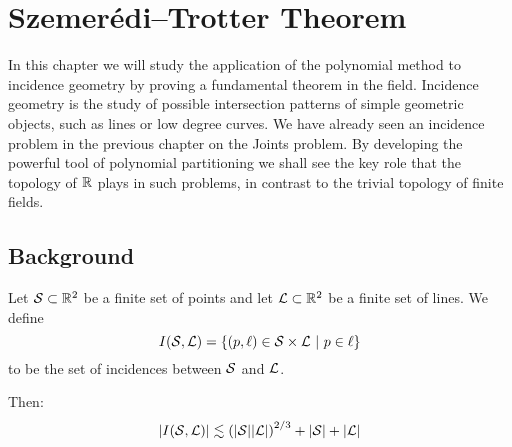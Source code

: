 \chapter{Szemerédi–Trotter Theorem}

In this chapter we will study the application of the polynomial method to incidence geometry by proving a fundamental theorem in the field.
Incidence geometry is the study of possible intersection patterns of simple geometric objects, such as lines or low degree curves. 
We have already seen an incidence problem in the previous chapter on the Joints problem. 
By developing the powerful tool of polynomial partitioning we shall see the key role that the topology of $\mathbb R$ plays in such problems, in contrast to the trivial topology of finite fields. 


\section{Background}



\begin{theorem}
    Let $\mathcal S \subset\mathbb R^2$ be a finite set of points and
    let $\mathcal L \subset \mathbb R^2$ be a finite set of lines. We define 
    \[I(\ES,\LL) = \{(p, \ell) \in \ES \times \LL \ | \ p \in \ell\}\] 
    to be the set of incidences between $\mathcal S$ and $\mathcal L$. 
   
    Then:
    \[
        |I(\mathcal S, \mathcal L)| \lesssim \left(|\mathcal S||\mathcal L|\right)^{2/3} + |\mathcal S| + |\mathcal L|
    \]
    
    \label{thm:S-T}
\end{theorem}

